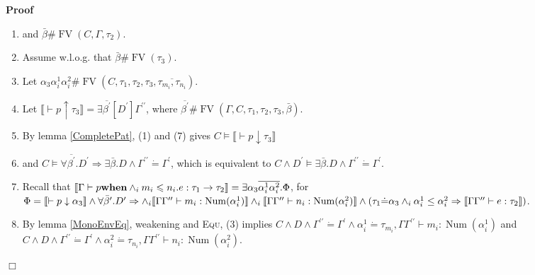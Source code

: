 \documentclass{article}
\newcommand{\tmname}[1]{\textsc{#1}}
\newcommand{\tmop}[1]{\ensuremath{\operatorname{#1}}}
\newcommand{\tmstrong}[1]{\textbf{#1}}
\newenvironment{proof}{\noindent\textbf{Proof\ }}{\hspace*{\fill}$\Box$\medskip}
\begin{document}
\begin{proof}
\begin{itemize}
\begin{enumerate}
      \item and $\bar{\beta} \# \tmop{FV} (C, \Gamma, \tau_2)$.
      
      \item Assume w.l.o.g. that $\bar{\beta} \# \tmop{FV} (\tau_3)$.
      
      \item Let $\alpha_3 \alpha_i^1 \alpha_i^2 \# \tmop{FV} (C, \tau_1,
      \tau_2, \tau_3, \overline{\tau_{m_i}, \tau_{n_i}})$.
      
      \item Let $\llbracket \vdash p \uparrow \tau_3 \rrbracket = \exists
      \overline{\beta^{\prime}} [D^{\prime}] \Gamma^{\prime\prime}$, where
      $\overline{\beta^{\prime}} \# \tmop{FV} (\Gamma, C, \tau_1, \tau_2,
      \tau_3, \bar{\beta})$.
      
      \item By lemma \ref{CompletePat}, (1) and (7) gives $C \vDash \llbracket
      \vdash p \downarrow \tau_3 \rrbracket$
      
      \item and $C \vDash \forall \overline{\beta^{\prime}} .D^{\prime}
      \Rightarrow \exists \bar{\beta} .D \wedge \Gamma^{\prime\prime} \dot{=}
      \Gamma^{\prime}$, which is equivalent to $C \wedge D^{\prime} \vDash
      \exists \bar{\beta} .D \wedge \Gamma^{\prime\prime} \dot{=}
      \Gamma^{\prime}$.
      
      \item Recall that $\left\llbracket \Gamma \vdash p
      \text{{\tmstrong{when}}} \wedge_i m_i \leqslant n_i .e : \tau_1
      \rightarrow \tau_2 \right\rrbracket = \exists \alpha_3
      \overline{\alpha^1_i \alpha^2_i} . \Phi$, for $\Phi = \\
      \llbracket \vdash p \downarrow \alpha_3 \rrbracket \wedge \forall
      \bar{\beta}^{\prime} .D^{\prime} \Rightarrow \wedge_i \llbracket \Gamma
      \Gamma^{\prime\prime} \vdash m_i : \tmop{Num} (\alpha^1_i) \rrbracket
      \wedge_i \llbracket \Gamma \Gamma^{\prime\prime} \vdash n_i : \tmop{Num}
      (\alpha^2_i) \rrbracket \wedge \\
      (\tau_1 \dot{=} \alpha_3 \wedge_i \alpha^1_i \leq \alpha^2_i
      \Rightarrow \llbracket \Gamma \Gamma^{\prime\prime} \vdash e : \tau_2
      \rrbracket)$.
      
      \item By lemma \ref{MonoEnvEq}, weakening and {\tmname{Equ}}, (3)
      implies $C \wedge D \wedge \Gamma^{\prime\prime} \dot{=} \Gamma^{\prime}
      \wedge \alpha^1_i \dot{=} \tau_{m_i}, \Gamma \Gamma^{\prime\prime}
      \vdash m_i : \tmop{Num} (\alpha^1_i)$ and $C \wedge D \wedge
      \Gamma^{\prime\prime} \dot{=} \Gamma^{\prime} \wedge \alpha^2_i \dot{=}
      \tau_{n_i}, \Gamma \Gamma^{\prime\prime} \vdash n_i : \tmop{Num}
      (\alpha^2_i)$.
      

\end{enumerate}
\end{itemize}
\end{proof}
\end{document}

